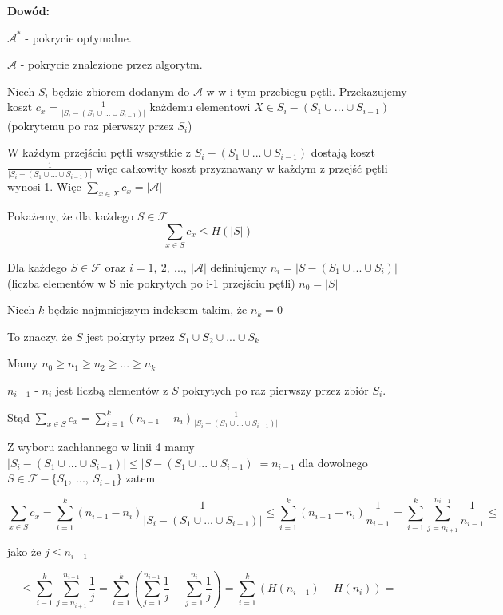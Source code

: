 \textbf{Dowód: }{}

$\mathcal{A}^{\ast}$ - pokrycie optymalne. 

$\mathcal{A}$ - pokrycie znalezione przez algorytm. 

Niech $S_i$ będzie zbiorem dodanym do $\mathcal{A}$ w w i-tym przebiegu pętli.
Przekazujemy koszt $c_x=\frac{1}{\vert S_i-(S_1\cup ... \cup S_{i-1})\vert}$ każdemu elementowi $X\in S_i - (S_1 \cup ... \cup S_{i-1})$ (pokrytemu po raz pierwszy przez $S_i$)

W każdym przejściu pętli wszystkie z $S_i - (S_1 \cup ... \cup S_{i-1})$ dostają koszt $\frac{1}{\vert S_i-(S_1\cup ... \cup S_{i-1})\vert}$ więc całkowity koszt przyznawany w każdym z przejść pętli wynosi 1.
Więc $\sum_{x\in X}c_x=\vert \mathcal{A}\vert$

Pokażemy, że dla każdego $S\in \mathcal{F}$ 
$$\sum_{x\in S}c_x \leq H(\vert S\vert)$$

Dla każdego $S\in \mathcal{F}$ oraz $i=1,\ 2,\ ...,\ \vert\mathcal{A}\vert$ definiujemy $n_i = \vert S - (S_1 \cup ... \cup S_i)\vert$ (liczba elementów w S nie pokrytych po i-1 przejściu pętli)
\tab $n_0=\vert S\vert$


Niech $k$ będzie najmniejszym indeksem takim, że $n_k=0$ 

To znaczy, że $S$ jest pokryty przez $S_1 \cup S_2 \cup ... \cup S_k$

Mamy $n_0\geq n_1\geq n_2\geq ...\geq n_k$ 

$n_{i-1}$ - $n_i$ jest liczbą elementów z $S$ pokrytych po raz pierwszy przez zbiór $S_i$.

Stąd $\sum_{x\in S}c_x = \sum_{i=1}^{k}(n_{i-1}-n_i)\frac{1}{\vert S_i - (S_1 \cup ... \cup S_{i-1})\vert}$

Z wyboru zachłannego w linii 4 mamy $\vert S_i - (S_1 \cup ... \cup S_{i-1})\vert \leq \vert S - (S_1 \cup ... \cup S_{i-1})\vert = n_{i-1}$ dla dowolnego $S \in \mathcal{F} - \lbrace S_1,\ ...,\ S_{i-1}\rbrace$ zatem

$$\sum_{x\in S} c_x = \sum_{i=1}^{k} (n_{i-1}-n_i)\frac{1}{\vert S_i - (S_1 \cup ... \cup S_{i-1})\vert} \leq \sum_{i=1}^{k}(n_{i-1}- n_i)\frac{1}{n_{i-1}}=\sum_{i-1}^{k}\sum_{j=n_{i+1}}^{n_{i-1}}\frac{1}{n_{i-1}} \leq$$

jako że $j\leq n_{i-1}$

$$\leq \sum_{i-1}^{k}\sum_{j=n_{i+1}}^{n_{i-1}}\frac{1}{j}=\sum_{i=1}^{k}(\sum_{j=1}^{n_{i-1}} \frac{1}{j}- \sum_{j=1}^{n_i} \frac{1}{j}) = \sum_{i=1}^{k} (H(n_{i-1}) - H(n_i)) = $$

